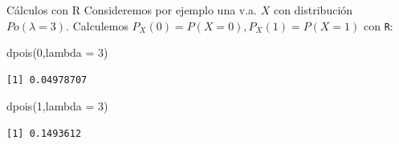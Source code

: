 \documentclass[
  ignorenonframetext,
  aspectratio=169]{beamer}
\newenvironment{Shaded}{\begin{snugshade}}{\end{snugshade}}
\newcommand{\AttributeTok}[1]{\textcolor[rgb]{0.40,0.45,0.13}{#1}}
\newcommand{\DecValTok}[1]{\textcolor[rgb]{0.68,0.00,0.00}{#1}}
\newcommand{\FunctionTok}[1]{\textcolor[rgb]{0.28,0.35,0.67}{#1}}
\newcommand{\NormalTok}[1]{\textcolor[rgb]{0.00,0.23,0.31}{#1}}
\begin{document}
\begin{frame}[fragile]{Cálculos con R}
\protect\hypertarget{cuxe1lculos-con-r-4}{}
Consideremos por ejemplo una v.a. \(X\) con distribución
\(Po(\lambda=3)\). Calculemos \(P_X(0)=P(X=0), P_X(1)=P(X=1)\) con
\texttt{R}:

\begin{Shaded}
\begin{Highlighting}[]
\FunctionTok{dpois}\NormalTok{(}\DecValTok{0}\NormalTok{,}\AttributeTok{lambda =} \DecValTok{3}\NormalTok{)}
\end{Highlighting}
\end{Shaded}

\begin{verbatim}
[1] 0.04978707
\end{verbatim}

\begin{Shaded}
\begin{Highlighting}[]
\FunctionTok{dpois}\NormalTok{(}\DecValTok{1}\NormalTok{,}\AttributeTok{lambda =} \DecValTok{3}\NormalTok{)}
\end{Highlighting}
\end{Shaded}

\begin{verbatim}
[1] 0.1493612
\end{verbatim}
\end{frame}
\end{document}
